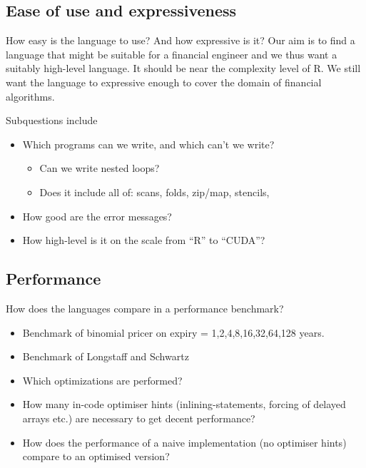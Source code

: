 \subsection{Ease of use and expressiveness}

How easy is the language to use? And how expressive is it? Our
aim is to find a language that might be suitable for a financial
engineer and we thus want a suitably high-level language. It should
be near the complexity level of R. We still want the language to
expressive enough to cover the domain of financial algorithms.

Subquestions include
\begin{itemize}
\item Which programs can we write, and which can't we write?
  \begin{itemize}
  \item Can we write nested loops?
  \item Does it include all of: scans, folds, zip/map, stencils,
  \end{itemize}
\item How good are the error messages?
\item How high-level is it on the scale from ``R'' to ``CUDA''?
\end{itemize}

\subsection{Performance} How does the languages compare in a
performance benchmark?
\begin{itemize}
\item Benchmark of binomial pricer on expiry = 1,2,4,8,16,32,64,128 years.
\item Benchmark of Longstaff and Schwartz
\item Which optimizations are performed?
\item How many in-code optimiser hints (inlining-statements, forcing
  of delayed arrays etc.) are necessary to get decent performance?
\item How does the performance of a naive implementation (no
  optimiser hints) compare to an optimised version?
\end{itemize}



